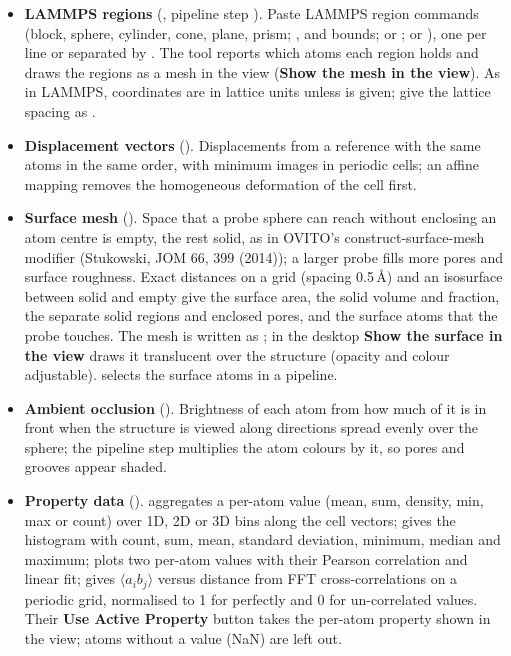 \begin{itemize}
\item \textbf{LAMMPS regions} (, pipeline step ). Paste LAMMPS region commands (block, sphere, cylinder, cone, plane, prism; ,  and  bounds;  or ;  or ), one per line or separated by \code{;}. The tool reports which atoms each region holds and draws the regions as a mesh in the view (\textbf{Show the mesh in the view}). As in LAMMPS, coordinates are in lattice units unless  is given; give the lattice spacing as .
\item \textbf{Displacement vectors} (). Displacements from a reference with the same atoms in the same order, with minimum images in periodic cells; an affine mapping removes the homogeneous deformation of the cell first.
\item \textbf{Surface mesh} (). Space that a probe sphere can reach without enclosing an atom centre is empty, the rest solid, as in OVITO's construct-surface-mesh modifier (Stukowski, JOM 66, 399 (2014)); a larger probe fills more pores and surface roughness. Exact distances on a grid (spacing 0.5\,\AA) and an isosurface between solid and empty give the surface area, the solid volume and fraction, the separate solid regions and enclosed pores, and the surface atoms that the probe touches. The mesh is written as ; in the desktop \textbf{Show the surface in the view} draws it translucent over the structure (opacity and colour adjustable).  selects the surface atoms in a pipeline.
\item \textbf{Ambient occlusion} (). Brightness of each atom from how much of it is in front when the structure is viewed along directions spread evenly over the sphere; the pipeline step multiplies the atom colours by it, so pores and grooves appear shaded.
\item \textbf{Property data} ().  aggregates a per-atom value (mean, sum, density, min, max or count) over 1D, 2D or 3D bins along the cell vectors;  gives the histogram with count, sum, mean, standard deviation, minimum, median and maximum;  plots two per-atom values with their Pearson correlation and linear fit;  gives $\langle a_ib_j\rangle$ versus distance from FFT cross-correlations on a periodic grid, normalised to 1 for perfectly and 0 for un-correlated values. Their \textbf{Use Active Property} button takes the per-atom property shown in the view; atoms without a value (NaN) are left out.

\end{itemize}
